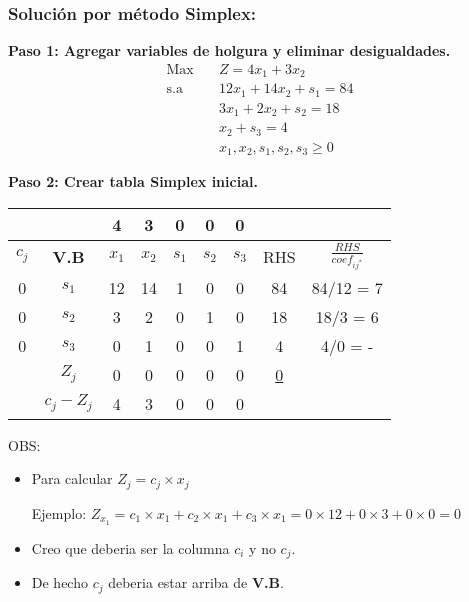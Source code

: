 \documentclass{templateNote}
\begin{document}
\subsubsection*{Solución por método Simplex:}
\textbf{Paso 1: Agregar variables de holgura y eliminar desigualdades.}
\begin{equation*}
    \begin{aligned}
        \text{Max} \quad & Z = 4x_1 + 3x_2 \\
        \text{s.a} \quad & 12x_1 + 14x_2 + s_1 = 84 \\
        & 3x_1 + 2x_2 + s_2 = 18 \\
        & x_2 + s_3 = 4\\
        & x_1, x_2, s_1, s_2, s_3 \geq 0
    \end{aligned}
\end{equation*}

\textbf{Paso 2: Crear tabla Simplex inicial.}
\begin{center}
    \begin{tabular}{|c|c|c|c|c|c|c|c|c|}
        \hline
        & & 4 & 3 & 0 & 0 & 0 &  &  \\ \hline
        $c_j$ & \textbf{V.B} & $x_1$ & $x_2$ & $s_1$ & $s_2$ & $s_3$ & RHS & $\displaystyle\frac{RHS}{coef_{ij^*}}$ \\ \hline
        0 & $s_1$ & 12 & 14 & 1 & 0 & 0 & 84 & 84/12 = 7 \\ \hline
        0 & $s_2$ & 3 & 2 & 0 & 1 & 0 & 18 & 18/3 = 6 \\ \hline
        0 & $s_3$ & 0 & 1 & 0 & 0 & 1 & 4 & 4/0 = - \\ \hline
        & $Z_j$ & 0 & 0 & 0 & 0 & 0 & \underline{0} &  \\ \hline
        & $c_j - Z_j$ & 4 & 3 & 0 & 0 & 0 &  &  \\ \hline
    \end{tabular}
\end{center}
OBS:
\begin{itemize}
    \item Para calcular $Z_j = c_j \times x_j $
    \begin{center}
        Ejemplo: $Z_{x_1} = c_1 \times x_1 + c_2 \times x_1 + c_3 \times x_1 = 0 \times 12 + 0 \times 3 + 0 \times 0 = 0$
    \end{center}

    \item Creo que deberia ser la columna $c_i$ y no $c_j$.
    \item De hecho $c_j$ deberia estar arriba de \textbf{V.B}.
\end{itemize}
\end{document}
